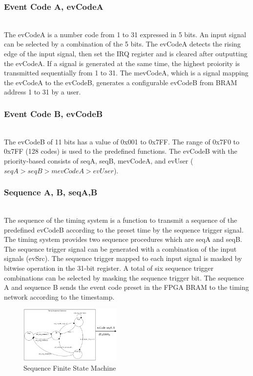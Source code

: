 \documentclass[journal,reqno]{IEEEtran}
\begin{document}
\subsubsection{Event Code A, evCodeA}\hspace*{\fill} \\
The evCodeA is a number code from 1 to 31 expressed in 5 bits. An input signal can be selected by a combination of the 5 bits. The evCodeA detects the rising edge of the input signal, then set the IRQ register and is cleared after outputting the evCodeA. If a signal is generated at the same time, the highest proiority is transmitted sequentially from 1 to 31. The mevCodeA, which is a signal mapping the evCodeA to the evCodeB, generates a configurable evCodeB from BRAM address 1 to 31 by a user.\newline

\subsubsection{Event Code B, evCodeB}\hspace*{\fill} \\
The evCodeB of 11 bits has a value of 0x001 to 0x7FF. The range of 0x7F0 to 0x7FF (128 codes) is used to the predefined functions. The evCodeB with the priority-based consists of seqA, seqB, mevCodeA, and evUser ($seqA > seqB > mevCodeA > evUser$). \newline

\subsubsection{Sequence A, B, seqA,B}\hspace*{\fill} \\
The sequence of the timing system is a function to transmit a sequence of the predefined evCodeB according to the preset time by the sequence trigger signal. The timing system provides two sequence procedures which are seqA and seqB. The sequence trigger signal can be generated with a combination of the input signals (evSrc). The sequence trigger mapped to each input signal is masked  by bitwise operation in the 31-bit register. A total of six sequence trigger combinations can be selected by masking the sequence trigger bit. The sequence A and sequence B sends the event code preset in the FPGA BRAM to the timing network according to the timestamp. 

\begin{figure}[!htb]
	\centering
	\includegraphics*[width=0.45\textwidth, height=0.35\textwidth]{img17.png}
	\caption{Sequence Finite State Machine}
	\label{sequence_fsm}
\end{figure}
\end{document}
